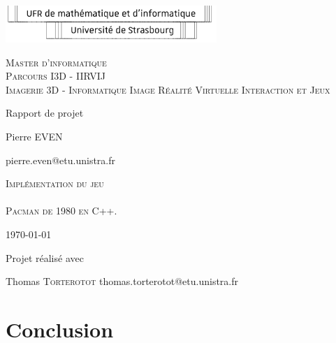 \documentclass [twoside,a4paper,11pt,french] {report}
\begin{document}

\begin{center}
    \includegraphics [width=8cm] {logo-ufr.pdf}       

    \vfill

    {
	\large
	\textsc{
	    Master d'informatique \\
	    Parcours I3D - IIRVIJ \\
		Imagerie 3D - Informatique Image Réalité Virtuelle Interaction et Jeux
	}
    }

    \bigskip\bigskip
    \bigskip\bigskip

    {\huge Rapport de projet}

    \bigskip\bigskip

    {\large Pierre \textsc{EVEN}}

    {\small pierre.even@etu.unistra.fr}

    
    \vfill

    {
	\huge
	\textsc{
		Implémentation du jeu \\
	    ~ \\
        Pacman de 1980 en C++.
	}
    }

    \vfill
    \vfill

    \today

    \vfill

    {\large Projet réalisé avec}

    \medskip

    {
		\large Thomas \textsc{Torterotot} \small{thomas.torterotot@etu.unistra.fr}
	}

    \bigskip

    \bigskip
\end{center}


{
    \parskip=0pt
    \tableofcontents
}

\cleardoublepage



\chapter{Conclusion}
    \label{chap:conc}
\end{document}
